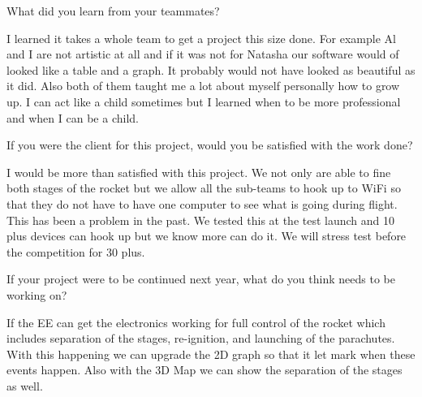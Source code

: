 \documentclass[10pt,draftclsnofoot,onecolumn]{IEEEtran}
\begin{document}
\begin{itemize}
	What did you learn from your teammates?

	I learned it takes a whole team to get a project this size done. For example Al and I are not artistic at all and if it was not for Natasha our software would of looked like a table and a graph. It probably would not have looked as beautiful as it did. Also both of them taught me a lot about myself personally how to grow up. I can act like a child sometimes but I learned when to be more professional and when I can be a child.

	If you were the client for this project, would you be satisfied with the work done?

	I would be more than satisfied with this project. We not only are able to fine both stages of the rocket but we allow all the sub-teams to hook up to WiFi so that they do not have to have one computer to see what is going during flight. This has been a problem in the past. We tested this at the test launch and 10 plus devices can hook up but we know more can do it. We will stress test before the competition for 30 plus.

	If your project were to be continued next year, what do you think needs to be working on?

	If the EE can get the electronics working for full control of the rocket which includes separation of the stages, re-ignition, and launching of the parachutes. With this happening we can upgrade the 2D graph so that it let mark when these events happen. Also with the 3D Map we can show the separation of the stages as well.
\end{itemize}
\end{document}
